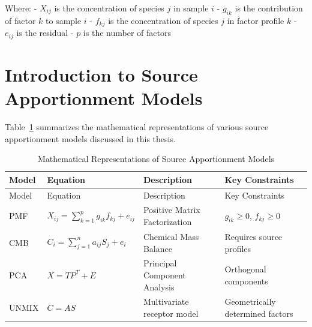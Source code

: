 \documentclass[
  letterpaper,
  oneside,
  openany]{MastersDoctoralThesis}
\begin{document}
Where: - \(X_{ij}\) is the concentration of species \(j\) in sample
\(i\) - \(g_{ik}\) is the contribution of factor \(k\) to sample \(i\) -
\(f_{kj}\) is the concentration of species \(j\) in factor profile \(k\)
- \(e_{ij}\) is the residual - \(p\) is the number of factors

\section{Introduction to Source Apportionment
Models}\label{sec-ch1-intro-models}

Table~\ref{tbl-intro-equations} summarizes the mathematical
representations of various source apportionment models discussed in this
thesis.

\begin{longtable}[]{@{}
  >{\raggedright\arraybackslash}p{}
  >{\raggedright\arraybackslash}p{}
  >{\raggedright\arraybackslash}p{}
  >{\raggedright\arraybackslash}p{}@{}}
\caption{Mathematical Representations of Source Apportionment
Models}\label{tbl-intro-equations}\tabularnewline
\toprule\noalign{}
\begin{minipage}[b]{\linewidth}\raggedright
Model
\end{minipage} & \begin{minipage}[b]{\linewidth}\raggedright
Equation
\end{minipage} & \begin{minipage}[b]{\linewidth}\raggedright
Description
\end{minipage} & \begin{minipage}[b]{\linewidth}\raggedright
Key Constraints
\end{minipage} \\
\midrule\noalign{}
\endfirsthead
\toprule\noalign{}
\begin{minipage}[b]{\linewidth}\raggedright
Model
\end{minipage} & \begin{minipage}[b]{\linewidth}\raggedright
Equation
\end{minipage} & \begin{minipage}[b]{\linewidth}\raggedright
Description
\end{minipage} & \begin{minipage}[b]{\linewidth}\raggedright
Key Constraints
\end{minipage} \\
\midrule\noalign{}
\endhead
\bottomrule\noalign{}
\endlastfoot
PMF & \(X_{ij} = \sum_{k=1}^{p} g_{ik}f_{kj} + e_{ij}\) & Positive
Matrix Factorization & \(g_{ik} \geq 0\), \(f_{kj} \geq 0\) \\
CMB & \(C_i = \sum_{j=1}^{n} a_{ij} S_{j} + e_i\) & Chemical Mass
Balance & Requires source profiles \\
PCA & \(X = TP^T + E\) & Principal Component Analysis & Orthogonal
components \\
UNMIX & \(C = AS\) & Multivariate receptor model & Geometrically
determined factors \\
\end{longtable}
\end{document}
